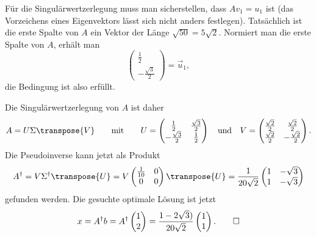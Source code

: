 \begin{loesung}
Für die Singulärwertzerlegung muss man sicherstellen, dass $Av_1=u_1$ ist
(das Vorzeichens eines Eigenvektors lässt sich nicht anders festlegen).
Tatsächlich ist die erste Spalte von $A$ ein Vektor der Länge
$\sqrt{50}=5\sqrt{2}$.
Normiert man die erste Spalte von $A$, erhält man
\[
\begin{pmatrix}
\frac{1}{2}\\-\frac{\sqrt{3}}2 
\end{pmatrix}
=
\vec{u}_1,
\]
die Bedingung ist also erfüllt.

Die Singulärwertzerlegung von $A$ ist daher
\[
A
=
U\Sigma \transpose{V}
\qquad\text{mit}\qquad
U
=
\begin{pmatrix}
\frac{1}{2}         & \frac{\sqrt{3}}{2} \\
-\frac{\sqrt{3}}{2} & \frac{1}{2}       
\end{pmatrix}
\quad \text{und}\quad
V
=
\begin{pmatrix}
\frac{\sqrt{2}}2 & \frac{\sqrt{2}}2 \\
\frac{\sqrt{2}}2 &-\frac{\sqrt{2}}2
\end{pmatrix}.
\]
Die Pseudoinverse kann jetzt als Produkt
\[
A^\dagger
=
V\Sigma^\dagger \transpose{U}
=
V\begin{pmatrix}
\frac{1}{10} & 0 \\
      0      & 0
\end{pmatrix} \transpose{U}
=
\frac{1}{20\sqrt{2}}
\begin{pmatrix}
1&-\sqrt{3}\\
1&-\sqrt{3}
\end{pmatrix}
\]
gefunden werden.
Die gesuchte optimale Lösung  ist jetzt
\[
x
=
A^\dagger b
=
A^\dagger \begin{pmatrix}1\\2\end{pmatrix}
=
\frac{1-2\sqrt{3})}{20\sqrt{2}}
\begin{pmatrix}
1\\1
\end{pmatrix}.
\qedhere
\]
\end{loesung}

